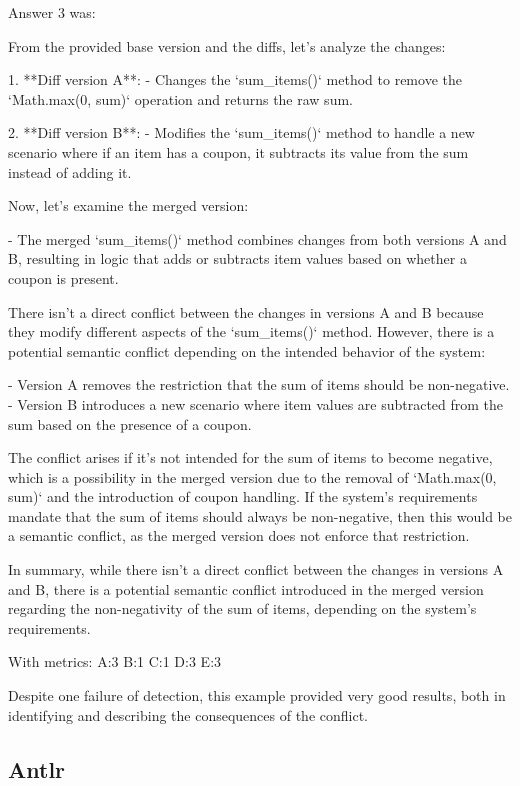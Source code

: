 Answer 3 was:
\begin{spverbatim}
From the provided base version and the diffs, let's analyze the changes:

1. **Diff version A**:
   - Changes the `sum_items()` method to remove the `Math.max(0, sum)` operation and returns the raw sum.
   
2. **Diff version B**:
   - Modifies the `sum_items()` method to handle a new scenario where if an item has a coupon, it subtracts its value from the sum instead of adding it.
   
Now, let's examine the merged version:

- The merged `sum_items()` method combines changes from both versions A and B, resulting in logic that adds or subtracts item values based on whether a coupon is present.
  
There isn't a direct conflict between the changes in versions A and B because they modify different aspects of the `sum_items()` method. However, there is a potential semantic conflict depending on the intended behavior of the system:

- Version A removes the restriction that the sum of items should be non-negative.
- Version B introduces a new scenario where item values are subtracted from the sum based on the presence of a coupon.

The conflict arises if it's not intended for the sum of items to become negative, which is a possibility in the merged version due to the removal of `Math.max(0, sum)` and the introduction of coupon handling. If the system's requirements mandate that the sum of items should always be non-negative, then this would be a semantic conflict, as the merged version does not enforce that restriction.

In summary, while there isn't a direct conflict between the changes in versions A and B, there is a potential semantic conflict introduced in the merged version regarding the non-negativity of the sum of items, depending on the system's requirements.
\end{spverbatim}

With metrics:
A:3
B:1
C:1
D:3
E:3

Despite one failure of detection, this example provided very good results, both in identifying and describing the consequences of the conflict.

\subsection{Antlr}

